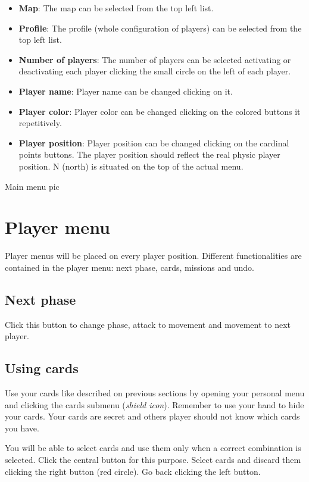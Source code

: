 \documentclass[12pt,a4paper]{article}
\begin{document}
\begin{itemize}
\item {\bf Map}: The map can be selected from the top left list.
\item {\bf Profile}: The profile (whole configuration of players) can be selected from the top left list.
\item {\bf Number of players}: The number of players can be selected activating or deactivating each player clicking the small circle on the left of each player.
\item {\bf Player name}: Player name can be changed clicking on it.
\item {\bf Player color}: Player color can be changed clicking on the colored buttons it repetitively.
\item {\bf Player position}: Player position can be changed clicking on the cardinal points buttons. The player position should reflect the real physic player position. N (north) is situated on the top of the actual menu.
\end{itemize}

\begin{todo}[Alberto]
  Main menu pic
\end{todo}

\section{Player menu}
Player menus will be placed on every player position. Different functionalities are contained in the player menu: next phase, cards, missions and undo.

\subsection{Next phase}
Click this button to change phase, attack to movement and movement to next player.

\subsection{Using cards}
Use your cards like described on previous sections by opening your personal menu and clicking the cards submenu ({\it shield icon}). Remember to use your hand to hide your cards. Your cards are secret and others player should not know which cards you have.

You will be able to select cards and use them only when a correct combination is selected. Click the central button for this purpose. Select cards and discard them clicking the right button (red circle). Go back clicking the left button.
\end{document}
